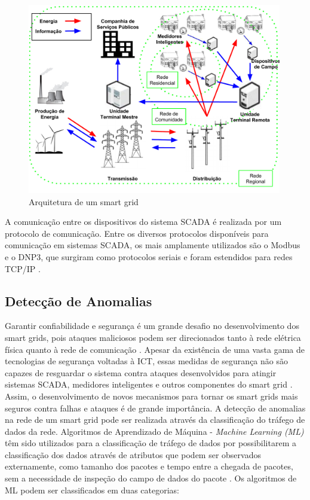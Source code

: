 \documentclass[12pt]{article}
\begin{document}
\begin{figure}[h]
   \caption{Arquitetura de um smart grid}
   \begin{center}
       \includegraphics[width=30em]{smart_grid_arch}
   \end{center}
   \label{fig:sgarchitecture}
\end{figure}

A comunicação entre os dispositivos do sistema SCADA é realizada por um protocolo de comunicação. Entre os diversos protocolos disponíveis para comunicação em sistemas SCADA, os mais amplamente utilizados são o Modbus e o DNP3, que surgiram como protocolos seriais e foram estendidos para redes TCP/IP \cite{drias2015taxonomy}.

\subsection{Detecção de Anomalias}
\label{mldetection}
	Garantir confiabilidade e segurança é um grande desafio no desenvolvimento dos smart grids, pois ataques maliciosos podem ser direcionados tanto à rede elétrica física quanto à rede de comunicação \cite{li2012securing}. Apesar da existência de uma vasta gama de tecnologias de segurança voltadas à ICT, essas medidas de segurança não são capazes de resguardar o sistema contra ataques desenvolvidos para atingir sistemas SCADA, medidores inteligentes e outros componentes do smart grid \cite{carcano2011multidim}. Assim, o desenvolvimento de novos mecanismos para tornar os smart grids mais seguros contra falhas e ataques é de grande importância.
	A detecção de anomalias na rede de um smart grid pode ser realizada através da classificação do tráfego de dados da rede. Algoritmos de Aprendizado de Máquina - \emph{Machine Learning (ML)} têm sido utilizados para a classificação de tráfego de dados por possibilitarem a classificação dos dados através de atributos que podem ser observados externamente, como tamanho dos pacotes e tempo entre a chegada de pacotes, sem a necessidade de inspeção do campo de dados do pacote \cite{nguyen2008survey}. Os algoritmos de ML podem ser classificados em duas categorias:
\end{document}

